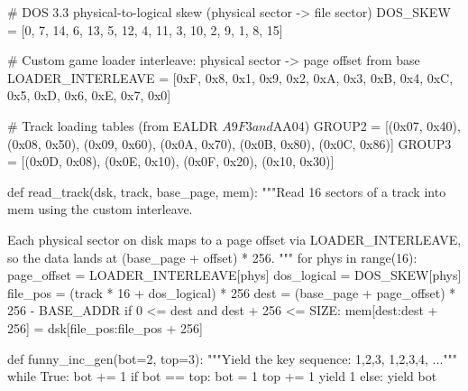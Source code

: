 \documentclass[10pt]{report}
\begin{document}
# DOS 3.3 physical-to-logical skew (physical sector -> file sector)
DOS_SKEW = [0, 7, 14, 6, 13, 5, 12, 4, 11, 3, 10, 2, 9, 1, 8, 15]

# Custom game loader interleave: physical sector -> page offset from base
LOADER_INTERLEAVE = [0xF, 0x8, 0x1, 0x9, 0x2, 0xA, 0x3, 0xB,
                     0x4, 0xC, 0x5, 0xD, 0x6, 0xE, 0x7, 0x0]

# Track loading tables (from EALDR $A9F3 and $AA04)
GROUP2 = [(0x07, 0x40), (0x08, 0x50), (0x09, 0x60),
          (0x0A, 0x70), (0x0B, 0x80), (0x0C, 0x86)]
GROUP3 = [(0x0D, 0x08), (0x0E, 0x10), (0x0F, 0x20), (0x10, 0x30)]
\nwendcode{}\nwdocspar

\nwenddocs{}\endmoddef\nwstartdeflinemarkup{}\nwenddeflinemarkup
def read_track(dsk, track, base_page, mem):
    """Read 16 sectors of a track into mem using the custom interleave.

    Each physical sector on disk maps to a page offset via
    LOADER_INTERLEAVE, so the data lands at (base_page + offset) * 256.
    """
    for phys in range(16):
        page_offset = LOADER_INTERLEAVE[phys]
        dos_logical = DOS_SKEW[phys]
        file_pos = (track * 16 + dos_logical) * 256
        dest = (base_page + page_offset) * 256 - BASE_ADDR
        if 0 <= dest and dest + 256 <= SIZE:
            mem[dest:dest + 256] = dsk[file_pos:file_pos + 256]
\nwendcode{}\nwdocspar

\nwenddocs{}\endmoddef\nwstartdeflinemarkup{}\nwenddeflinemarkup
def funny_inc_gen(bot=2, top=3):
    """Yield the  key sequence: 1,2,3, 1,2,3,4, ..."""
    while True:
        bot += 1
        if bot == top:
            bot = 1
            top += 1
            yield 1
        else:
            yield bot
\nwendcode{}\nwdocspar
\end{document}
